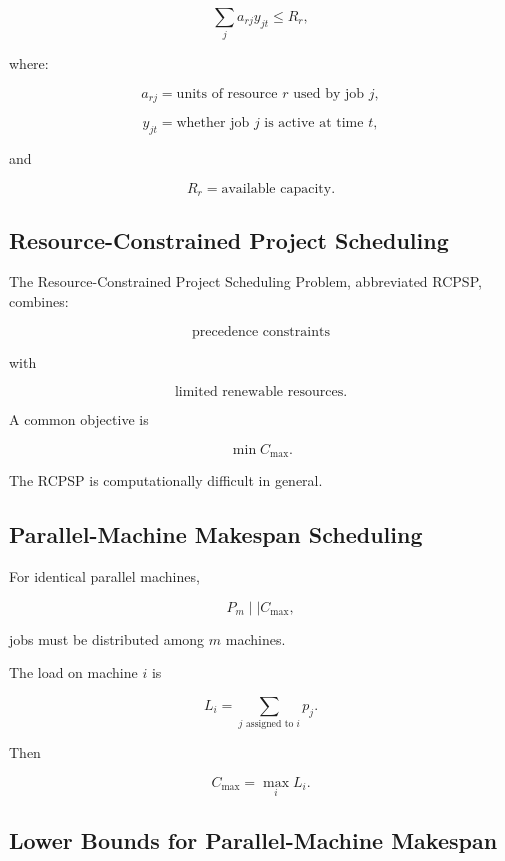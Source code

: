 \[
\boxed{
\sum_j
a_{rj}
y_{jt}
\leq
R_r,
}
\]

where:

\[
a_{rj}
=
\text{units of resource }r\text{ used by job }j,
\]

\[
y_{jt}
=
\text{whether job }j\text{ is active at time }t,
\]

and

\[
R_r
=
\text{available capacity}.
\]

\subsection{Resource-Constrained Project Scheduling}
\label{subsec:rcpsp}

The Resource-Constrained Project Scheduling Problem, abbreviated RCPSP,
combines:

\[
\boxed{
\text{precedence constraints}
}
\]

with

\[
\boxed{
\text{limited renewable resources}.
}
\]

A common objective is

\[
\boxed{
\min C_{\max}.
}
\]

The RCPSP is computationally difficult in general.

\subsection{Parallel-Machine Makespan Scheduling}
\label{subsec:parallel-machine-makespan}

For identical parallel machines,

\[
\boxed{
P_m
\mid
\mid
C_{\max},
}
\]

jobs must be distributed among \(m\) machines.

The load on machine \(i\) is

\[
\boxed{
L_i
=
\sum_{j\text{ assigned to }i}
p_j.
}
\]

Then

\[
\boxed{
C_{\max}
=
\max_i
L_i.
}
\]

\subsection{Lower Bounds for Parallel-Machine Makespan}
\label{subsec:parallel-machine-lower-bounds}

